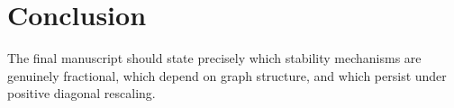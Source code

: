 \section{Conclusion}
The final manuscript should state precisely which stability mechanisms are genuinely fractional, which depend on graph structure, and which persist under positive diagonal rescaling.

